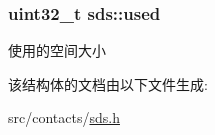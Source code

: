 \subsubsection[{\texorpdfstring{used}{used}}]{\setlength{\rightskip}{0pt plus 5cm}uint32\+\_\+t sds\+::used}\hypertarget{structsds_a5d733da962855ed70322d900c51eb65f}{}\label{structsds_a5d733da962855ed70322d900c51eb65f}
使用的空间大小 

该结构体的文档由以下文件生成\+:\begin{DoxyCompactItemize}
\item 
src/contacts/\hyperlink{sds_8h}{sds.\+h}\end{DoxyCompactItemize}
